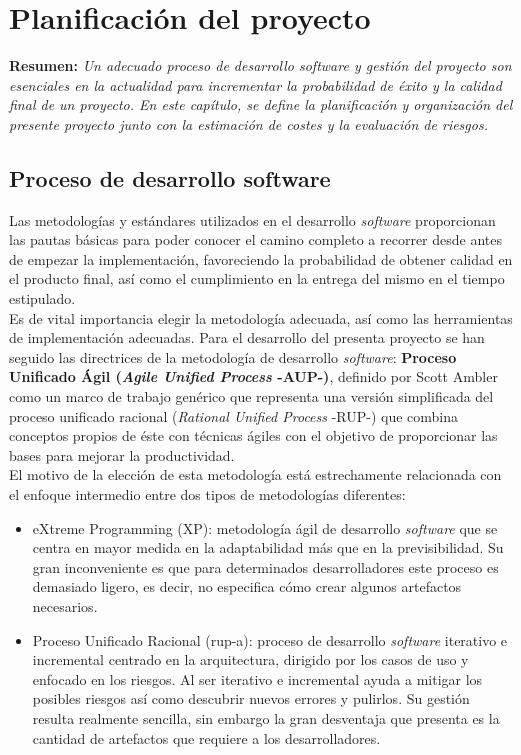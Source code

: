 \documentclass[12pt,a4paper, twoside]{report}
\begin{document}
	\chapter{Planificación del proyecto} \label{planningChapter}
	
	\textbf{Resumen:} \textit{Un adecuado proceso de desarrollo software y gestión del proyecto son esenciales en la actualidad para incrementar la probabilidad de éxito y la calidad final de un proyecto. En este capítulo, se define la planificación y organización del presente proyecto junto con la estimación de costes y la evaluación de riesgos.}
	
	\section{Proceso de desarrollo software}

	Las metodologías y estándares utilizados en el desarrollo \textit{software} proporcionan las pautas básicas para poder conocer el camino completo a recorrer desde antes de empezar la implementación, favoreciendo la probabilidad de obtener calidad en el producto final, así como el cumplimiento en la entrega del mismo en el tiempo estipulado. \\
	
	Es de vital importancia elegir la metodología adecuada, así como las herramientas de implementación adecuadas. Para el desarrollo del presenta proyecto se han seguido las directrices de la metodología de desarrollo \textit{software}: \textbf{Proceso Unificado Ágil (\textit{Agile Unified Process} -AUP-)}, definido por Scott Ambler como un marco de trabajo genérico que representa una versión simplificada del proceso unificado racional (\textit{Rational Unified Process} -RUP-) que combina conceptos propios de éste con técnicas ágiles con el objetivo de proporcionar las bases para mejorar la productividad. \\
	
	El motivo de la elección de esta metodología está estrechamente relacionada con el enfoque intermedio entre dos tipos de metodologías diferentes:
	
	\begin{itemize}
		\item eXtreme Programming (XP): metodología ágil de desarrollo \textit{software} que se centra en mayor medida en la adaptabilidad más que en la previsibilidad. Su gran inconveniente es que para determinados desarrolladores este proceso es demasiado ligero, es decir, no especifica cómo crear algunos artefactos necesarios.
		
		\item Proceso Unificado Racional (\gls{rup-a}): proceso de desarrollo \textit{software} iterativo e incremental centrado en la arquitectura, dirigido por los casos de uso y enfocado en los riesgos. Al ser iterativo e incremental ayuda a mitigar los posibles riesgos así como descubrir nuevos errores y pulirlos. Su gestión resulta realmente sencilla, sin embargo la gran desventaja que presenta es la cantidad de artefactos que requiere a los desarrolladores.
	\end{itemize}
	
\end{document}
